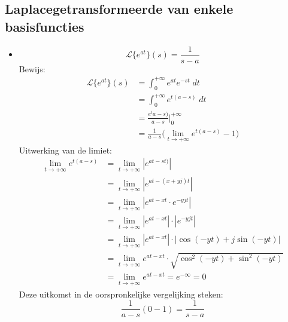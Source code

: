 \documentclass[12pt]{report}
\begin{document}
\subsection{Laplacegetransformeerde van enkele basisfuncties}
\begin{itemize}
 \item $$\mathcal{L}\{e^{at}\}(s) = \frac{1}{s - a}$$
 Bewijs:
 \begin{equation*}
  \begin{split}
   \mathcal{L}\{e^{at}\}(s) & = \int_{0}^{+\infty}e^{at}e^{-st} \; dt \\
                            & = \int_{0}^{+\infty} e^{t(a - s)} \; dt \\
                            & = \frac{e^t{a - s)}}{a - s}\bigg|_{0}^{+\infty} \\
                            & = \frac{1}{a - s}\bigg(\lim_{t \to +\infty}e^{t(a - s)} - 1\bigg)                         
  \end{split}
 \end{equation*}
  Uitwerking van de limiet:
  \begin{equation*}
   \begin{split}
    \lim_{t \to +\infty}e^{t(a - s)} & = \lim_{t \to +\infty}|e^{at - st)} | \\
                                     & = \lim_{t \to +\infty}|e^{at - (x + yj)t}| \\
                                     & = \lim_{t \to +\infty}|e^{at - xt}\cdot e^{-yjt}| \\
                                     & = \lim_{t \to +\infty}|e^{at - xt}|\cdot |e^{-yjt}| \\
                                     & = \lim_{t \to +\infty}|e^{at - xt}|\cdot |\cos(-yt) + j\sin(-yt)| \\
                                     & = \lim_{t \to +\infty}e^{at - xt}\cdot \sqrt{\cos^2(-yt) + \sin^2(-yt)} \\
                                     & = \lim_{t \to +\infty}e^{at - xt} = e^{-\infty} = 0
   \end{split}
  \end{equation*}
 Deze uitkomst in de oorspronkelijke vergelijking steken:
 $$\frac{1}{a - s}(0 - 1) = \frac{1}{s - a}$$ 
 

\end{itemize}
\end{document}
